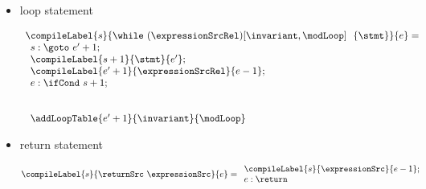 \begin{itemize}
      \item loop statement

 $$\begin{array}{l} \compileLabel{s}{\while \ (\expressionSrcRel) \lbrack \invariant, \modLoop \rbrack \ \do \ \{ \stmt \} }{e} = \\
         \begin{array}{l}
              s: \goto \ e' + 1; \\
	      \compileLabel{s +  1}{\stmt}{e' }; \\
	      \compileLabel{e' +  1}{\expressionSrcRel}{e  -1 };\\
	      e: \ifCond \ s +  1; \\
	      \\\\
	      \addLoopTable{e'+1}{\invariant }{\modLoop}
	 \end{array}
    \end{array}
$$



 \item return statement

 $$ \compileLabel{s}{\returnSrc  \  \expressionSrc }{e } =  
\begin{array}{l} 
\compileLabel{s}{ \expressionSrc }{e - 1};\\
 e : \return
\end{array}   $$
\end{itemize}


